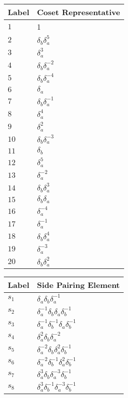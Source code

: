 \documentclass{article}
\begin{document}
\begin{center}
\begin{tabular}{ll}
\toprule
Label & Coset Representative\\
\midrule
$1$ & 1 \\
$2$ & $\delta_b^{}\delta_a^{5}$ \\
$3$ & $\delta_a^{3}$ \\
$4$ & $\delta_b^{}\delta_a^{-2}$ \\
$5$ & $\delta_b^{}\delta_a^{-4}$ \\
$6$ & $\delta_a^{}$ \\
$7$ & $\delta_b^{}\delta_a^{-1}$ \\
$8$ & $\delta_a^{4}$ \\
$9$ & $\delta_a^{2}$ \\
$10$ & $\delta_b^{}\delta_a^{-3}$ \\
$11$ & $\delta_b^{}$ \\
$12$ & $\delta_a^{5}$ \\
$13$ & $\delta_a^{-2}$ \\
$14$ & $\delta_b^{}\delta_a^{3}$ \\
$15$ & $\delta_b^{}\delta_a^{}$ \\
$16$ & $\delta_a^{-4}$ \\
$17$ & $\delta_a^{-1}$ \\
$18$ & $\delta_b^{}\delta_a^{4}$ \\
$19$ & $\delta_a^{-3}$ \\
$20$ & $\delta_b^{}\delta_a^{2}$ \\
\bottomrule
\end{tabular}
\hfill
\begin{tabular}{ll}
\toprule
Label & Side Pairing Element\\
\midrule
$s_{1}$ & $\delta_a^{}\delta_b^{}\delta_a^{-1}$ \\
$s_{2}$ & $\delta_a^{-1}\delta_b^{}\delta_a^{}\delta_b^{-1}$ \\
$s_{3}$ & $\delta_a^{-1}\delta_b^{-1}\delta_a^{}\delta_b^{-1}$ \\
$s_{4}$ & $\delta_a^{2}\delta_b^{}\delta_a^{-2}$ \\
$s_{5}$ & $\delta_a^{-2}\delta_b^{}\delta_a^{2}\delta_b^{-1}$ \\
$s_{6}$ & $\delta_a^{-2}\delta_b^{-1}\delta_a^{2}\delta_b^{-1}$ \\
$s_{7}$ & $\delta_a^{3}\delta_b^{}\delta_a^{-3}\delta_b^{-1}$ \\
$s_{8}$ & $\delta_a^{3}\delta_b^{-1}\delta_a^{-3}\delta_b^{-1}$ \\

\end{tabular}
\end{center}
\end{document}
